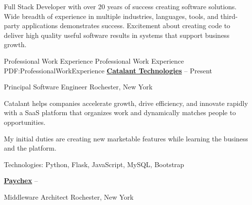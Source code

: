 \documentclass[letterpaper,MMMMyyyy,nonstopmode]{simpleresumecv}
\begin{document}
\begin{Body}

Full Stack Developer with over 20 years of success creating software solutions.
Wide breadth of experience in multiple industries, languages, tools, and third-party applications demonstrates success.
Excitement about creating code to deliver high quality useful software results in systems that support business growth.
\iffalse
\Entry
Full Stack Java architect, developer, and consultant, specializing in Java/Oracle/JavaScript
solutions and integrations.
\Gap
\textit{Technical Specialties}: Java, J2EE/JavaEE, SQL, PL/SQL, JavaScript, CSS, JMS, jQuery, jQuery UI, RabbitMQ, Oracle, Cognos, JBoss, WebLogic, AppDynamics.
\Gap
\textit{Business Specialties}: Agile team leadership, customer-focused development, requirements gathering and analysis, technical liaison, systems integration, business intelligence
\fi

\Section
{Professional\newline
Work Experience}
{Professional Work Experience}
{PDF:ProfessionalWorkExperience}
\Entry
\href{http://www.gocatalant.com}
{\textbf{Catalant Technologies}}
\hfill
{} -- Present

Principal Software Engineer
\hfill
Rochester, New York

\begin{Detail}
Catalant helps companies accelerate growth, drive efficiency, and innovate rapidly with a SaaS platform that organizes work and dynamically matches people to opportunities. 

\BulletItem
My initial duties are creating new marketable features while learning the business and the platform.

\Gap
Technologies: Python, Flask, JavaScript, MySQL, Bootstrap

\end{Detail}

\BigGap

\Entry
\href{http://www.paychex.com}
{\textbf{Paychex}}
\hfill
{} -- 

Middleware Architect %
\hfill
Rochester, New York

\begin{Detail}
\iffalse
At Paychex I work with cross-functional teams to build: an inventory system to track hosts, managed VMs, databases, and middleware appliances; machine learning systems to efficiently repack databases and to predict system utilization based on user metrics; a ground-up implementation of the Netflix Chaos Monkey; implemented AppDynamics on over 20,000 JVMs; and a system to collect and monitor JVM metrics and send alerts via SNMP and SMTP.
\fi


\end{Detail}
\end{Body}
\end{document}
